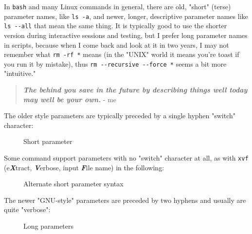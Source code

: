 \documentclass[10pt,american,]{book}
\makeatletter
\newenvironment{Shaded}{\begin{snugshade}}{\end{snugshade}}
\newcommand{\KeywordTok}[1]{\textcolor[rgb]{0.13,0.29,0.53}{\textbf{{#1}}}}
\newcommand{\NormalTok}[1]{{#1}}
\numberwithin{figure}{chapter}
\DeclareRobustCommand{\drcap}[1]{\begin{figure}[H]\caption{#1}\end{figure}}
\DeclareRobustCommand{\drcmd}[1]{\index{Commands!#1@\texttt{#1}}}
\renewcommand{\KeywordTok}[1]{{#1}}
\renewcommand{\NormalTok}[1]{{#1}}
\makeatother
\begin{document}
In \texttt{bash} and many Linux commands in general, there are old,
"short" (terse) parameter names, like \texttt{ls\ -a}, and newer,
longer, descriptive parameter names like \texttt{ls\ -\/-all} that mean
the same thing. It is typically good to use the shorter version during
interactive sessions and testing, but I prefer long parameter names in
scripts, because when I come back and look at it in two years, I may not
remember what \texttt{rm\ -rf\ *}\drcmd{rm} means (in the "UNIX" world
it means you're toast if you run it by mistake), thus
\texttt{rm\ -\/-recursive\ -\/-force\ *} seems a bit more "intuitive."

\begin{quote}
\textbf{\emph{The behind you save in the future by describing things
well today may well be your own.}} - me
\end{quote}

The older style parameters are typically preceded by a single hyphen
"switch" character:

\drcap{Short parameter}

\begin{Shaded}
\end{Shaded}

Some command support parameters with no "switch" character at all, as
with \texttt{xvf} (e\textbf{\emph{X}}tract, \textbf{\emph{V}}erbose,
input \textbf{\emph{F}}ile name) in the following:

\drcap{Alternate short parameter syntax}

\begin{Shaded}
\end{Shaded}

The newer "GNU-style" parameters are preceded by two hyphens and usually
are quite "verbose":

\drcap{Long parameters}

\begin{Shaded}
\end{Shaded}
\end{document}
